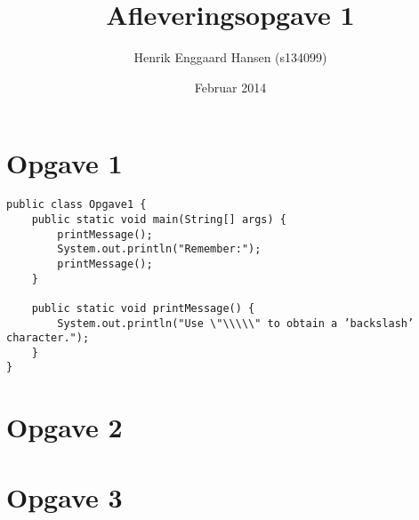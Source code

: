 \documentclass{article}
\begin{document}
\title{Afleveringsopgave 1}
\author{Henrik Enggaard Hansen (s134099)}
\date{Februar 2014}
\maketitle

\section*{Opgave 1}
\begin{verbatim}
public class Opgave1 {
	public static void main(String[] args) {
		printMessage();
		System.out.println("Remember:");
		printMessage();
	}

	public static void printMessage() {
		System.out.println("Use \"\\\\\" to obtain a ’backslash’ character.");
	}
}
\end{verbatim}

\section*{Opgave 2}

\section*{Opgave 3}
\end{document}
